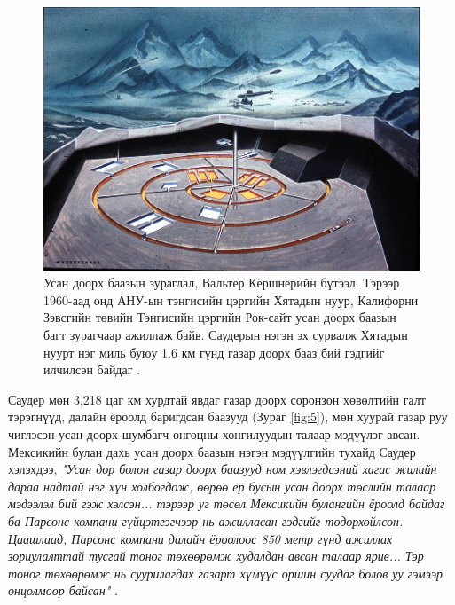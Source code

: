 \documentclass[10pt,twocolumn,letterpaper]{article}
\begin{document}
\begin{figure}[t]
\begin{center}
   \includegraphics[width=1\linewidth]{undersea.jpg}
\end{center}
   \caption{Усан доорх баазын зураглал, Вальтер Кёршнерийн бүтээл. Тэрээр 1960-аад онд АНУ-ын тэнгисийн цэргийн Хятадын нуур, Калифорни Зэвсгийн төвийн Тэнгисийн цэргийн Рок-сайт усан доорх баазын багт зурагчаар ажиллаж байв. Саудерын нэгэн эх сурвалж Хятадын нуурт нэг миль буюу 1.6 км гүнд газар доорх бааз бий гэдгийг илчилсэн байдаг \cite{22,23}.}
\label{fig:5}
\label{fig:onecol}
\end{figure}

Саудер мөн 3,218 цаг км хурдтай явдаг газар доорх соронзон хөвөлтийн галт тэрэгнүүд, далайн ёроолд баригдсан баазууд (Зураг \ref{fig:5}), мөн хуурай газар руу чиглэсэн усан доорх шумбагч онгоцны хонгилуудын талаар мэдүүлэг авсан. Мексикийн булан дахь усан доорх баазын нэгэн мэдүүлгийн тухайд Саудер хэлэхдээ, \textit{"Усан дор болон газар доорх баазууд ном хэвлэгдсэний хагас жилийн дараа надтай нэг хүн холбогдож, өөрөө ер бусын усан доорх төслийн талаар мэдээлэл бий гэж хэлсэн... тэрээр уг төсөл Мексикийн булангийн ёроолд байдаг ба Парсонс компани гүйцэтгэгчээр нь ажилласан гэдгийг тодорхойлсон. Цаашлаад, Парсонс компани далайн ёроолоос 850 метр гүнд ажиллах зориулалттай тусгай тоног төхөөрөмж худалдан авсан талаар ярив... Тэр тоног төхөөрөмж нь суурилагдах газарт хүмүүс оршин суудаг болов уу гэмээр онцолмоор байсан"} \cite{22}.
\end{document}

